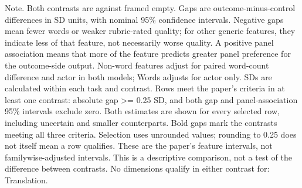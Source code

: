 \begin{table}[t]
\begin{minipage}{\linewidth}
Note. Both contrasts are against framed empty. Gaps are outcome-minus-control differences in SD units, with nominal 95\% confidence intervals. Negative gaps mean fewer words or weaker rubric-rated quality; for other generic features, they indicate less of that feature, not necessarily worse quality. A positive panel association means that more of the feature predicts greater panel preference for the outcome-side output. Non-word features adjust for paired word-count difference and actor in both models; Words adjusts for actor only. SDs are calculated within each task and contrast. Rows meet the paper's criteria in at least one contrast: absolute gap >= 0.25 SD, and both gap and panel-association 95\% intervals exclude zero. Both estimates are shown for every selected row, including uncertain and smaller counterparts. Bold gaps mark the contrasts meeting all three criteria. Selection uses unrounded values; rounding to 0.25 does not itself mean a row qualifies. These are the paper's feature intervals, not familywise-adjusted intervals. This is a descriptive comparison, not a test of the difference between contrasts. No dimensions qualify in either contrast for: Translation.
\end{minipage}
\end{table}
